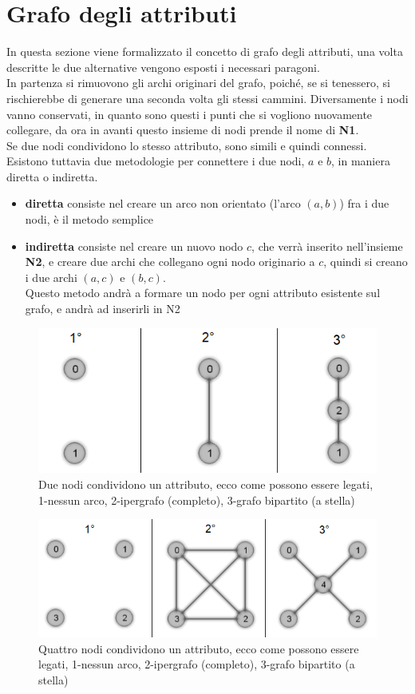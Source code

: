 \section{Grafo degli attributi}
In questa sezione viene formalizzato il concetto di grafo degli attributi, una volta descritte le due alternative vengono esposti i necessari paragoni.\\
In partenza si rimuovono gli archi originari del grafo, poiché, se si tenessero, si rischierebbe di generare una seconda volta gli stessi cammini. Diversamente i nodi vanno conservati, in quanto sono questi i punti che si vogliono nuovamente collegare, da ora in avanti questo insieme di nodi prende il nome di \textbf{N1}.\\
Se due nodi condividono lo stesso attributo, sono simili e quindi connessi. Esistono tuttavia due metodologie per connettere i due nodi, $a$ e $b$, in maniera diretta o indiretta.
\begin{itemize}
	\item \textbf{diretta} consiste nel creare un arco non orientato (l'arco $(a, b)$) fra i due nodi, è il metodo semplice
	\item \textbf{indiretta} consiste nel creare un nuovo nodo $c$, che verrà inserito nell'insieme \textbf{N2}, e creare due archi che collegano ogni nodo originario a $c$, quindi si creano i due archi $(a, c)$ e $(b, c)$.\\
	Questo metodo andrà a formare un nodo per ogni attributo esistente sul grafo, e andrà ad inserirli in N2
\end{itemize}
%
\begin{figure}[htp]
	\centering
	\includegraphics{immagini/add_att2}
	\caption{Due nodi condividono un attributo, ecco come possono essere legati, 1-nessun arco, 2-ipergrafo (completo), 3-grafo bipartito (a stella)}
	\label{fig:add_att2}
\end{figure}
\begin{figure}[htp]
	\centering
	\includegraphics[width=\linewidth]{immagini/add_att4}
	\caption{Quattro nodi condividono un attributo, ecco come possono essere legati, 1-nessun arco, 2-ipergrafo (completo), 3-grafo bipartito (a stella)}
	\label{fig:add_att4}
\end{figure}

